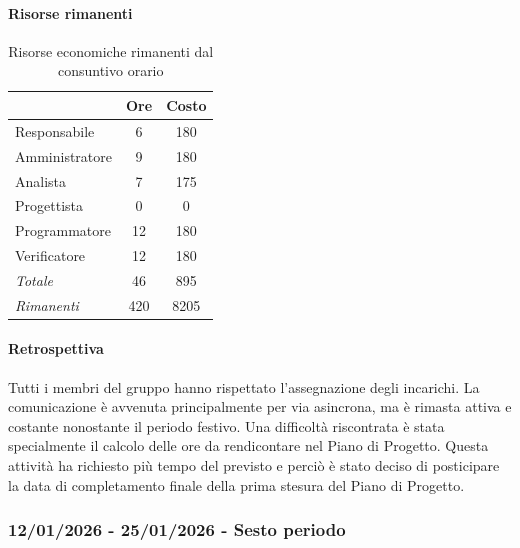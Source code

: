 \documentclass[a4paper,12pt]{article}
\begin{document}
            \paragraph{Risorse rimanenti}
                \begin{table}[H]
                \centering
                \caption{Risorse economiche rimanenti dal consuntivo orario}
                \begin{tabular}{|l|c|c|}
                \hline
                    \rowcolor{lightgray}{\textbf{Ruolo}} & {\textbf{Ore}} & {\textbf{Costo}}\\
                \hline
                    Responsabile & 6 & 180\\
                \hline
                    Amministratore & 9 & 180\\
                \hline
                    Analista & 7 & 175\\
                \hline
                    Progettista & 0 & 0\\
                \hline
                    Programmatore & 12 & 180\\
                \hline
                    Verificatore & 12 & 180\\
                \hline
                    \rowcolor{lightgray}\textit{Totale} & 46 & 895\\
                \hline
                    \rowcolor{lightgray}\textit{Rimanenti} & 420 & 8205\\
                \hline
                \end{tabular}
                \end{table}
                
            \paragraph{Retrospettiva}
            Tutti i membri del gruppo hanno rispettato l'assegnazione degli incarichi. La comunicazione è avvenuta principalmente per via asincrona, ma è rimasta attiva e costante nonostante il periodo festivo. Una difficoltà riscontrata è stata specialmente il calcolo delle ore da rendicontare nel Piano di Progetto. Questa attività ha richiesto più tempo del previsto e perciò è stato deciso di posticipare la data di completamento finale della prima stesura del Piano di Progetto.

        \subsubsection{12/01/2026 - 25/01/2026 - Sesto periodo}
\end{document}
